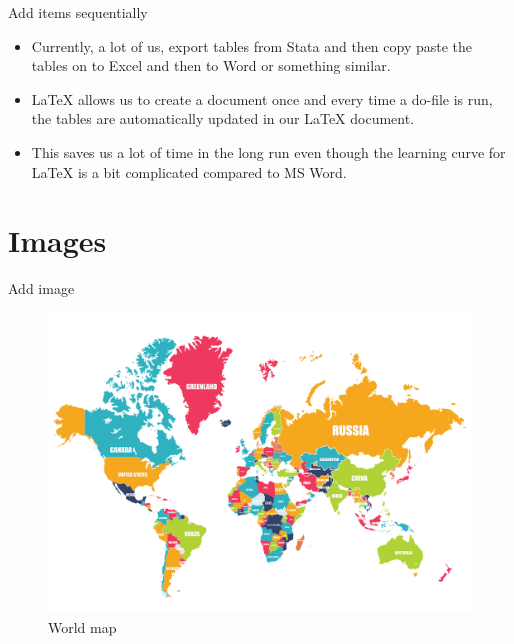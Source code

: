 \documentclass{beamer}
\begin{document}
\begin{frame}{Add items sequentially}	

	\begin{itemize}
		\item<1->Currently, a lot of us, export tables from Stata and then copy paste the tables on to Excel and then to Word or something similar. 
		\item<2->{\LaTeX} allows us to create a document once and every time a do-file is run, the tables are automatically updated in our {\LaTeX} document.
		\item<3->This saves us a lot of time in the long run even though the learning curve for {\LaTeX} is a bit complicated compared to MS Word. 
		
	\end{itemize}
\end{frame}

\section{Images}
\begin{frame}{Add image}	

	\begin{figure}
		\centering
		\includegraphics[height=.7\textheight]{img/world-map}
		\caption{World map}
		\label{fig:world-map}
	\end{figure}
	
\end{frame}
\end{document}
